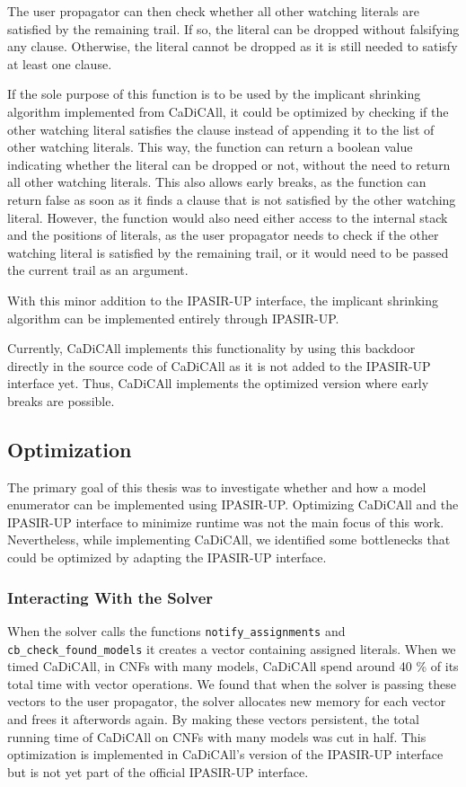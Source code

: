 \documentclass[12pt,a4paper]{article}
\begin{document}
The user propagator can then check whether all other watching literals are satisfied by the remaining trail. If so, the literal can be dropped without falsifying any clause. Otherwise, the literal cannot be dropped as it is still needed to satisfy at least one clause.

If the sole purpose of this function is to be used by the implicant shrinking algorithm implemented from CaDiCAll, it could be optimized by checking if the other watching literal satisfies the clause instead of appending it to the list of other watching literals. This way, the function can return a boolean value indicating whether the literal can be dropped or not, without the need to return all other watching literals. This also allows early breaks, as the function can return false as soon as it finds a clause that is not satisfied by the other watching literal. However, the function would also need either access to the internal stack and the positions of literals, as the user propagator needs to check if the other watching literal is satisfied by the remaining trail, or it would need to be passed the current trail as an argument.

With this minor addition to the IPASIR-UP interface, the implicant shrinking algorithm can be implemented entirely through IPASIR-UP.

Currently, CaDiCAll implements this functionality by using this backdoor directly in the source code of CaDiCAll as it is not added to the IPASIR-UP interface yet. Thus, CaDiCAll implements the optimized version where early breaks are possible.

\subsection{Optimization}

The primary goal of this thesis was to investigate whether and how a model enumerator can be implemented using IPASIR-UP. Optimizing CaDiCAll and the IPASIR-UP interface to minimize runtime was not the main focus of this work. Nevertheless, while implementing CaDiCAll, we identified some bottlenecks that could be optimized by adapting the IPASIR-UP interface.

\subsubsection{Interacting With the Solver}

When the solver calls the functions \verb|notify_assignments| and \verb|cb_check_found_models| it creates a vector containing assigned literals. When we timed CaDiCAll, in CNFs with many models, CaDiCAll spend around 40 \% of its total time with vector operations. We found that when the solver is passing these vectors to the user propagator, the solver allocates new memory for each vector and frees it afterwords again. By making these vectors persistent, the total running time of CaDiCAll on CNFs with many models was cut in half. This optimization is implemented in CaDiCAll's version of the IPASIR-UP interface but is not yet part of the official IPASIR-UP interface.
\end{document}
